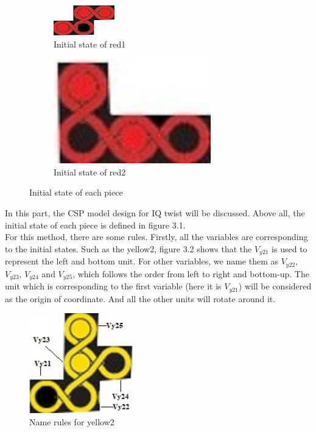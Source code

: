 \begin{figure}[htbp]
\begin{subfigure}[b]{.24\textwidth}
\centering
\includegraphics[width =\textwidth]{figs/red1.jpg}
\caption{Initial state of red1}
  \label{fig:2Dred1}
\end{subfigure}
\begin{subfigure}[b]{.24\textwidth}
\centering
\includegraphics[width=0.75\textwidth]{figs/red2.jpg}
\caption{Initial state of red2}
  \label{fig:2Dred2}
\end{subfigure}
\caption{Initial state of each piece}
  \label{fig:allinit}
\end{figure}
In this part, the CSP model design for IQ twist will be discussed. Above all, the initial state of each piece is defined in figure 3.1.
\\For this method, there are some rules. Firstly, all the variables are corresponding to the initial states. Such as the yellow2, figure 3.2 shows that the $V_{y21}$ is used to represent the left and bottom unit. For other variables, we name them as $V_{y22}$, $V_{y23}$, $V_{y24}$ and $V_{y25}$, which follows the order from left to right and bottom-up. The unit which is corresponding to the first variable (here it is $V_{y21}$) will be considered as the origin of coordinate. And all the other units will rotate around it. 
\begin{figure}[htbp]
    \centering
    \includegraphics[width=0.4\textwidth]{figs/example.jpg}
    \caption{Name rules for yellow2}
    \label{fig:namerules}
\end{figure}
